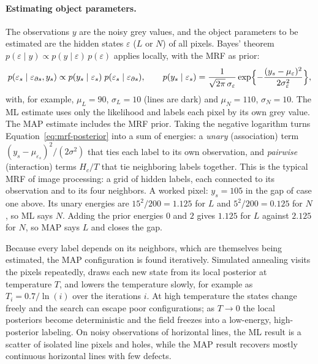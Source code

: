 \paragraph{Estimating object parameters.}
The observations $y$ are the noisy grey values, and the object parameters to be
estimated are the hidden states $\varepsilon$ ($L$ or $N$) of all pixels. Bayes'
theorem $p(\varepsilon\mid y)\propto p(y\mid\varepsilon)\,p(\varepsilon)$ applies
locally, with the MRF as prior:
\begin{equation}
  p(\varepsilon_s\mid\varepsilon_{\partial s}, y_s)
  \propto p(y_s\mid\varepsilon_s)\;p(\varepsilon_s\mid\varepsilon_{\partial s}),
  \qquad
  p(y_s\mid\varepsilon_s)
  = \frac{1}{\sqrt{2\pi}\,\sigma_{\varepsilon}}
    \exp\Bigl\{-\frac{(y_s-\mu_{\varepsilon})^2}{2\sigma_{\varepsilon}^2}\Bigr\},
  \label{eq:mrf-posterior}
\end{equation}
\noindent
with, for example, $\mu_L = 90$, $\sigma_L = 10$ (lines are dark) and
$\mu_N = 110$, $\sigma_N = 10$. The ML estimate uses only the likelihood and
labels each pixel by its own grey value. The MAP estimate includes the MRF
prior. Taking the negative logarithm turns Equation~\eqref{eq:mrf-posterior}
into a sum of energies: a \emph{unary} (association) term
$(y_s-\mu_{\varepsilon_s})^2/(2\sigma^2)$ that ties each label to its own
observation, and \emph{pairwise} (interaction) terms $H_c/T$ that tie
neighboring labels together. This is the typical MRF of image processing: a
grid of hidden labels, each connected to its observation and to its four
neighbors. A worked pixel: $y_s = 105$ in the gap of case one above. Its unary
energies are $15^2/200 = 1.125$ for $L$ and $5^2/200 = 0.125$ for $N$, so ML says
$N$. Adding the prior energies $0$ and $2$ gives $1.125$ for $L$ against
$2.125$ for $N$, so MAP says $L$ and closes the gap.

Because every label depends on its neighbors, which are themselves being
estimated, the MAP configuration is found iteratively. Simulated annealing
visits the pixels repeatedly, draws each new state from its local posterior at
temperature $T$, and lowers the temperature slowly, for example as
$T_i = 0.7/\ln(i)$ over the iterations $i$. At high temperature the states
change freely and the search can escape poor configurations; as $T\to 0$ the
local posteriors become deterministic and the field freezes into a
low-energy, high-posterior labeling. On noisy observations of horizontal
lines, the ML result is a scatter of isolated line pixels and holes, while the
MAP result recovers mostly continuous horizontal lines with few defects.

